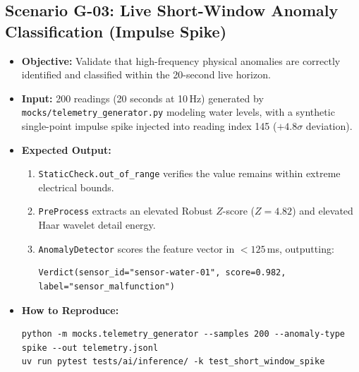 \documentclass[11pt,a4paper]{article}
\begin{document}
\subsection{Scenario G-03: Live Short-Window Anomaly Classification (Impulse Spike)}
\begin{itemize}[leftmargin=*,itemsep=1.5pt]
  \item \textbf{Objective:} Validate that high-frequency physical anomalies are correctly identified and classified within the 20-second live horizon.
  \item \textbf{Input:} 200 readings (20 seconds at 10\,Hz) generated by \texttt{mocks/telemetry\_generator.py} modeling water levels, with a synthetic single-point impulse spike injected into reading index 145 ($+4.8\sigma$ deviation).
  \item \textbf{Expected Output:}
  \begin{enumerate}[label=\alph*.,leftmargin=1.5em]
    \item \texttt{StaticCheck.out\_of\_range} verifies the value remains within extreme electrical bounds.
    \item \texttt{PreProcess} extracts an elevated Robust $Z$-score ($Z = 4.82$) and elevated Haar wavelet detail energy.
    \item \texttt{AnomalyDetector} scores the feature vector in $<125$\,ms, outputting:
\begin{lstlisting}
Verdict(sensor_id="sensor-water-01", score=0.982, label="sensor_malfunction")
\end{lstlisting}
  \end{enumerate}
  \item \textbf{How to Reproduce:}
\begin{lstlisting}
python -m mocks.telemetry_generator --samples 200 --anomaly-type spike --out telemetry.jsonl
uv run pytest tests/ai/inference/ -k test_short_window_spike
\end{lstlisting}
\end{itemize}
\end{document}
